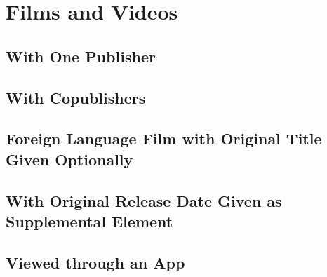 \documentclass{article}
\begin{document}
\section{Films and Videos} %
\label{sec:films_and_videos}
\subsection{With One Publisher} %
\label{sub:with_one_publisher}
\begin{refsection}
	\printbibliography[heading=none]
\end{refsection}
\subsection{With Copublishers} %
\label{sub:with_copublishers}
\begin{refsection}
	\printbibliography[heading=none]
\end{refsection}
\subsection{Foreign Language Film with Original Title Given Optionally} %
\label{sub:foreign_language_film_with_original_title_given_optionally}
\begin{refsection}
	\printbibliography[heading=none]
\end{refsection}
\subsection{With Original Release Date Given as Supplemental Element} %
\label{sub:with_original_release_date_given_as_supplemental_element}
\begin{refsection}
	\printbibliography[heading=none]
\end{refsection}
\subsection{Viewed through an App} %
\label{sub:film_viewed_through_an_app}
\begin{refsection}
	\printbibliography[heading=none]
\end{refsection}
\end{document}

